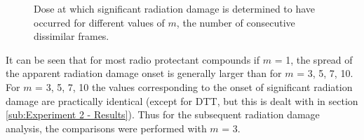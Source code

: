 \begin{figure}
\begin{subfigure}[b]{0.75\textwidth}
            \caption{}
            \label{}
    \end{subfigure}
    \caption[Dose at which significant radiation damage is determined to have occurred for different values of $m$, the number of consecutive dissimilar frames.]{Dose at which significant radiation damage is determined to have occurred for different values of $m$, the number of consecutive dissimilar frames.}
    \label{fig:Num consecutive frame test}
\end{figure}
It can be seen that for most radio protectant compounds if $m$ = 1, the spread of the apparent radiation damage onset is generally larger than for $m$ = 3, 5, 7, 10.
For $m$ = 3, 5, 7, 10 the values corresponding to the onset of significant radiation damage are practically identical (except for DTT, but this is dealt with in section \ref{sub:Experiment 2 - Results}).
Thus for the subsequent radiation damage analysis, the comparisons were performed with $m$ = 3.

